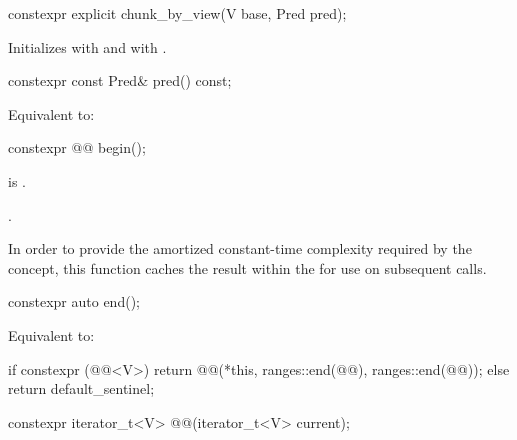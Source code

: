 %
\begin{itemdecl}
constexpr explicit chunk_by_view(V base, Pred pred);
\end{itemdecl}

\begin{itemdescr}
\pnum
\effects
Initializes  with  and
 with .
\end{itemdescr}

%
\begin{itemdecl}
constexpr const Pred& pred() const;
\end{itemdecl}

\begin{itemdescr}
\pnum
\effects
Equivalent to: 
\end{itemdescr}

%
\begin{itemdecl}
constexpr @@ begin();
\end{itemdecl}

\begin{itemdescr}
\pnum
\expects
{} is .

\pnum
\returns
{}.

\pnum
\remarks
In order to provide
the amortized constant-time complexity required by the  concept,
this function caches the result within the 
for use on subsequent calls.
\end{itemdescr}

%
\begin{itemdecl}
constexpr auto end();
\end{itemdecl}

\begin{itemdescr}
\pnum
\effects
Equivalent to:
\begin{codeblock}
if constexpr (@@<V>) {
  return @@(*this, ranges::end(@@), ranges::end(@@));
} else {
  return default_sentinel;
}
\end{codeblock}
\end{itemdescr}

%
\begin{itemdecl}
constexpr iterator_t<V> @@(iterator_t<V> current);
\end{itemdecl}

